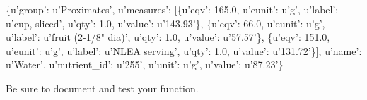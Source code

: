 \documentclass[11pt]{article}
\newenvironment{Shaded}{}{}
\newcommand{\FloatTok}[1]{\textcolor[rgb]{0.25,0.63,0.44}{{#1}}}
\newcommand{\StringTok}[1]{\textcolor[rgb]{0.25,0.44,0.63}{{#1}}}
\newcommand{\NormalTok}[1]{{#1}}
\begin{document}
\begin{Shaded}
\begin{Highlighting}[]
\NormalTok{\{}\StringTok{u'group'}\NormalTok{: }\StringTok{u'Proximates'}\NormalTok{,}
 \StringTok{u'measures'}\NormalTok{: [\{}\StringTok{u'eqv'}\NormalTok{: }\FloatTok{165.0}\NormalTok{,}
   \StringTok{u'eunit'}\NormalTok{: }\StringTok{u'g'}\NormalTok{,}
   \StringTok{u'label'}\NormalTok{: }\StringTok{u'cup, sliced'}\NormalTok{,}
   \StringTok{u'qty'}\NormalTok{: }\FloatTok{1.0}\NormalTok{,}
   \StringTok{u'value'}\NormalTok{: }\StringTok{u'143.93'}\NormalTok{\},}
\NormalTok{  \{}\StringTok{u'eqv'}\NormalTok{: }\FloatTok{66.0}\NormalTok{,}
   \StringTok{u'eunit'}\NormalTok{: }\StringTok{u'g'}\NormalTok{,}
   \StringTok{u'label'}\NormalTok{: }\StringTok{u'fruit (2-1/8" dia)'}\NormalTok{,}
   \StringTok{u'qty'}\NormalTok{: }\FloatTok{1.0}\NormalTok{,}
   \StringTok{u'value'}\NormalTok{: }\StringTok{u'57.57'}\NormalTok{\},}
\NormalTok{  \{}\StringTok{u'eqv'}\NormalTok{: }\FloatTok{151.0}\NormalTok{,}
   \StringTok{u'eunit'}\NormalTok{: }\StringTok{u'g'}\NormalTok{,}
   \StringTok{u'label'}\NormalTok{: }\StringTok{u'NLEA serving'}\NormalTok{,}
   \StringTok{u'qty'}\NormalTok{: }\FloatTok{1.0}\NormalTok{,}
   \StringTok{u'value'}\NormalTok{: }\StringTok{u'131.72'}\NormalTok{\}],}
 \StringTok{u'name'}\NormalTok{: }\StringTok{u'Water'}\NormalTok{,}
 \StringTok{u'nutrient_id'}\NormalTok{: }\StringTok{u'255'}\NormalTok{,}
 \StringTok{u'unit'}\NormalTok{: }\StringTok{u'g'}\NormalTok{,}
 \StringTok{u'value'}\NormalTok{: }\StringTok{u'87.23'}\NormalTok{\}}
\end{Highlighting}
\end{Shaded}

Be sure to document and test your function.
\end{document}
